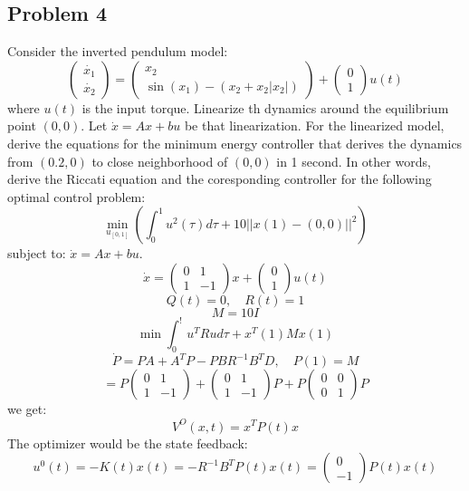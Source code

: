 \documentclass{article}
\begin{document}
\subsection*{Problem 4}
Consider the inverted pendulum model:
\[\begin{pmatrix}\dot{x_1}\\\dot{x_2}\end{pmatrix}=\begin{pmatrix}x_2\\\sin(x_1)-(x_2+x_2\lvert x_2\rvert)\end{pmatrix}+\begin{pmatrix}0\\1\end{pmatrix}u(t)\]
where $u(t)$ is the input torque. Linearize th dynamics around the equilibrium point $(0,0)$. Let $\dot{x}=Ax+bu$ be that linearization. For the linearized model, derive the equations for the minimum energy controller that derives the dynamics from $(0.2,0)$ to close neighborhood of $(0,0)$ in 1 second. In other words, derive the Riccati equation and the coresponding controller for the following optimal control problem:
\[\min_{u_{[0,1]}}\left (\int_0^1 u^2(\tau)d\tau+10\lvert\lvert x(1)-(0,0)\rvert\rvert^2\right )\]
subject to: $\dot{x}=Ax+bu$.\\

\[\dot{x}=\begin{pmatrix}0&1\\1&-1\end{pmatrix}x+\begin{pmatrix}0\\1\end{pmatrix}u(t)\]
\[Q(t)=0,\quad R(t)=1\]
\[M=10I\]
\[\min \int_0^! u^T Rud\tau+x^T(1)Mx(1)\]
\[\dot{P}=PA+A^TP-PBR^{-1}B^TD,\quad P(1)=M\]
\[=P\begin{pmatrix}0 & 1\\1 & -1\end{pmatrix}+\begin{pmatrix}0&1\\1&-1\end{pmatrix}P+P\begin{pmatrix}0&0\\0&1\end{pmatrix}P\]
we get:
\[V^O(x,t)=x^TP(t)x\]
The optimizer would be the state feedback:
\[u^0(t)=-K(t)x(t)=-R^{-1}B^TP(t)x(t)=\begin{pmatrix}0\\-1\end{pmatrix}P(t)x(t)\]
\end{document}
